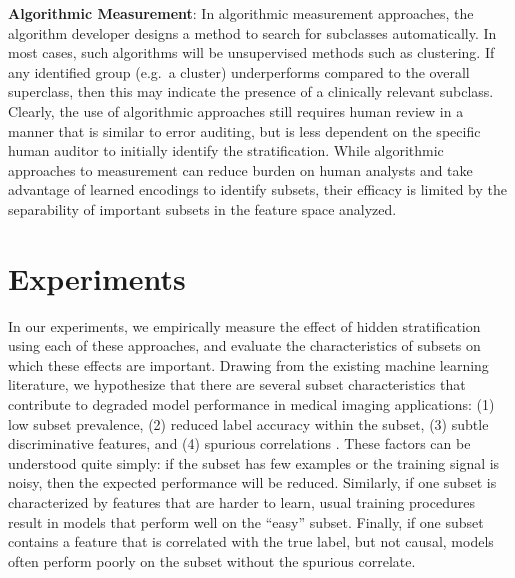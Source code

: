\documentclass[sigconf,anonymous,review]{acmart}
\begin{document}
\textbf{Algorithmic Measurement}: In algorithmic measurement approaches, the algorithm developer designs a method to search for subclasses automatically. 
In most cases, such algorithms will be unsupervised methods such as clustering. 
If any identified group (e.g.~a cluster) underperforms compared to the overall superclass, then this may indicate the presence of a clinically relevant subclass.
Clearly, the use of algorithmic approaches still requires human review in a manner that is similar to error auditing, but is less dependent on the specific human auditor to initially identify the stratification.  
While algorithmic approaches to measurement can reduce burden on human analysts and take advantage of learned encodings to identify subsets, their efficacy is limited by the separability of important subsets in the feature space analyzed.

\section{Experiments}
\label{sec:exps}

In our experiments, we empirically measure the effect of hidden stratification using each of these approaches, and evaluate the characteristics of subsets on which these effects are important.  
Drawing from the existing machine learning literature, we hypothesize that there are several subset characteristics that contribute to degraded model performance in medical imaging applications: (1) low subset prevalence, (2) reduced label accuracy within the subset, (3) subtle discriminative features, and (4) spurious correlations \citep{Selbst2017-gz}. 
These factors can be understood quite simply: if the subset has few examples or the training signal is noisy, then the expected performance will be reduced.  
Similarly, if one subset is characterized by features that are harder to learn, usual training procedures result in models that perform well on the ``easy'' subset.
Finally, if one subset contains a feature that is correlated with the true label, but not causal, models often perform poorly on the subset without the spurious correlate.
\end{document}
